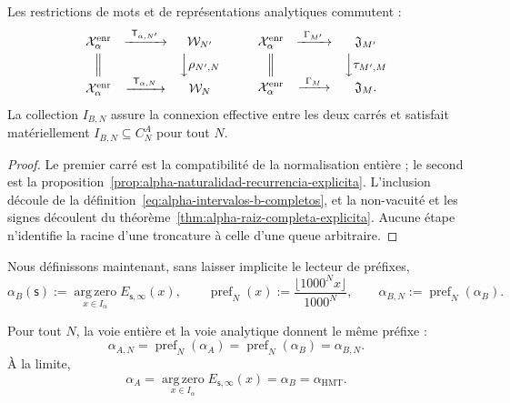 \begin{proposition}
\label{prop:alpha-cuadrados-compatibilidad}
Les restrictions de mots et de représentations analytiques commutent :
\[
\begin{array}{ccc}
 \mathcal X_\alpha^{\mathrm{enr}}&
 \xrightarrow{\ \mathsf T_{\alpha,N'}\ }&\mathcal W_{N'}\\[1mm]
 \Big\Vert&&\Big\downarrow\rho_{N',N}\\[1mm]
 \mathcal X_\alpha^{\mathrm{enr}}&
 \xrightarrow{\ \mathsf T_{\alpha,N}\ }&\mathcal W_N
\end{array}
\qquad
\begin{array}{ccc}
 \mathcal X_\alpha^{\mathrm{enr}}&
 \xrightarrow{\ \Gamma_{M'}\ }&\mathfrak J_{M'}\\[1mm]
 \Big\Vert&&\Big\downarrow\tau_{M',M}\\[1mm]
 \mathcal X_\alpha^{\mathrm{enr}}&
 \xrightarrow{\ \Gamma_M\ }&\mathfrak J_M .
\end{array}
\]
La collection \(I_{B,N}\) assure la connexion effective entre les deux
carrés et satisfait matériellement
\(I_{B,N}\subseteq C_N^A\) pour tout \(N\).
\end{proposition}

\begin{proof}
Le premier carré est la compatibilité de la normalisation entière ; le second est la proposition~\ref{prop:alpha-naturalidad-recurrencia-explicita}. L'inclusion découle de la définition~\eqref{eq:alpha-intervalos-b-completos}, et la non-vacuité et les signes découlent du théorème~\ref{thm:alpha-raiz-completa-explicita}. Aucune étape n'identifie la racine d'une troncature à celle d'une queue arbitraire.
\end{proof}

Nous définissons maintenant, sans laisser implicite le lecteur de préfixes,
\begin{equation}
 \alpha_B(\mathsf s):=
 \operatorname*{arg\,zero}_{x\in I_\alpha}E_{\mathsf s,\infty}(x),
 \qquad
 \operatorname{pref}_N(x):=
 \frac{\lfloor1000^Nx\rfloor}{1000^N},
 \qquad
 \alpha_{B,N}:=\operatorname{pref}_N(\alpha_B).
 \label{eq:alpha-definicion-b-y-prefijos-rev08}
\end{equation}

\begin{theorem}
\label{thm:alpha-dos-publicaciones-completas}
Pour tout \(N\), la voie entière et la voie analytique donnent le même préfixe :
\begin{equation}
 \boxed{\alpha_{A,N}=\operatorname{pref}_N(\alpha_A)
 =\operatorname{pref}_N(\alpha_B)=\alpha_{B,N}.}
 \label{eq:alpha-dos-vias-cada-nivel}
\end{equation}
À la limite,
\begin{equation}
 \boxed{\alpha_A
 =\operatorname*{arg\,zero}_{x\in I_\alpha}
       E_{\mathsf s,\infty}(x)
 =\alpha_B=\alpha_{\mathrm{HMT}}.}
 \label{eq:alpha-dos-vias-limite-coinductivo}
\end{equation}
\end{theorem}


